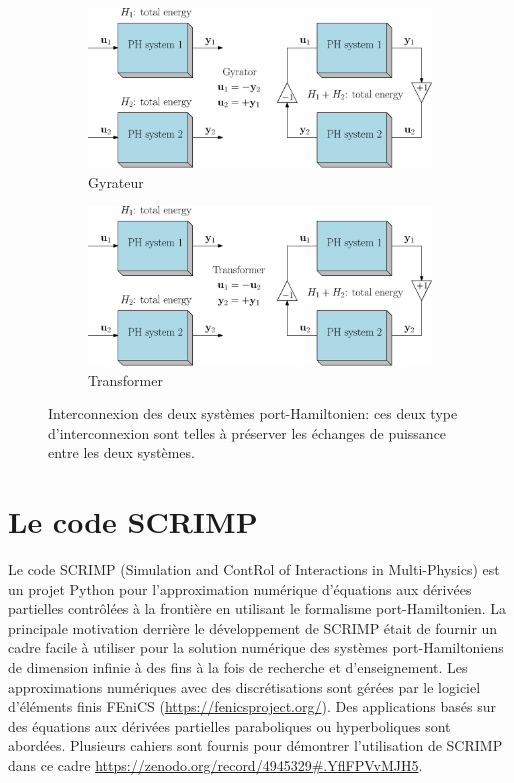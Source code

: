 \documentclass[12pt, french]{article}
\begin{document}
	
	\begin{figure}[tbh]
		\begin{subfigure}[t]{0.45\textwidth}
			\includegraphics[width=\columnwidth]{sketch_PH_gyrator.eps} 
			\caption{Gyrateur}
			\label{fig:pHsys_gyr}
		\end{subfigure}\hfill
		\begin{subfigure}[t]{0.45\textwidth}
			\includegraphics[width=\columnwidth]{sketch_PH_transformer.eps}%
			\caption{Transformer}
			\label{fig:pHsys_tran}
		\end{subfigure}
		\caption[]{Interconnexion des deux systèmes port-Hamiltonien: ces deux type d'interconnexion sont telles \`a préserver les échanges de puissance entre les deux systèmes.}%
		\label{fig:intPH}%
	\end{figure}

	\section{Le code SCRIMP}\label{sec:SCRIMP}
	Le code SCRIMP (Simulation and ContRol of Interactions in Multi-Physics) est un projet Python pour l'approximation numérique d'équations aux dérivées partielles contrôlées \`a la frontière en utilisant le formalisme port-Hamiltonien. La principale motivation derrière le développement de SCRIMP était de fournir un cadre facile à utiliser pour la solution numérique des systèmes port-Hamiltoniens de dimension infinie à des fins à la fois de recherche et d'enseignement. Les approximations numériques avec des discrétisations sont gérées par le logiciel d'éléments finis FEniCS (\url{https://fenicsproject.org/}). Des applications basés sur des équations aux dérivées partielles paraboliques ou hyperboliques sont abordées. Plusieurs cahiers sont fournis pour démontrer l'utilisation de SCRIMP dans ce cadre \url{https://zenodo.org/record/4945329\#.YflFPVvMJH5}.


	
	
	
	
\end{document}
